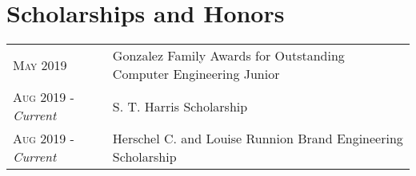 \documentclass[a4paper,11pt]{article}
\begin{document}
\section{Scholarships and Honors}
\begin{tabularx}{\textwidth}{lX}
   \textsc{May 2019} & Gonzalez Family Awards for Outstanding Computer Engineering Junior\\
   \textsc{Aug 2019} \-- \emph{Current} & S. T. Harris Scholarship\\
   \textsc{Aug 2019} \-- \emph{Current} & Herschel C. and Louise Runnion Brand Engineering Scholarship\\
\end{tabularx}
\end{document}
